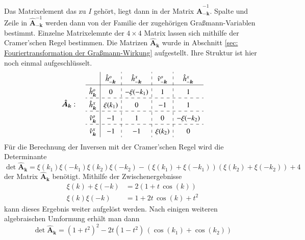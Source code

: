 \noindent Das Matrixelement das zu $I$ gehört, liegt dann in der Matrix $\bm{\hat{A}}_{-\bm{k}}^{-1}$. Spalte und Zeile in  $\bm{\hat{A}}_{-\bm{k}}^{-1}$ werden dann von der Familie der zugehörigen Graßmann-Variablen bestimmt. Einzelne Matrixelemnte der $4\times4$ Matrix lassen sich mithilfe der Cramer'schen Regel bestimmen. Die Matrizen $\bm{\hat{A}_{\bm{k}}}$ wurde in Abschnitt \ref{sec: Fouriertransformation der Graßmann-Wirkung} aufgestellt. Ihre Struktur ist hier noch einmal aufgeschlüsselt.
\begin{equation} \label{eq: struct A_k}
\renewcommand{\arraystretch}{1.5}
    \bm{\hat{A}}_{\bm{k}} : \;\;\;\; \begin{array}{c|c:c:c:c} 
                           & \hat{h}_{-\bm{k}}^o & \hat{h}_{-\bm{k}}^x & \hat{v}_{-\bm{k}}^o & \hat{h}_{-\bm{k}}^x  \\ \hline
        \hat{h}_{\bm{k}}^o & 0                   & -\xi(-k_1)            &  1                  & 1                   \\ \hdashline
        \hat{h}_{\bm{k}}^x & \xi(k_1)          & 0                   &  -1                  &  1                   \\ \hdashline
        \hat{v}_{\bm{k}}^o &-1                   & 1                  &  0                  & -\xi(-k_2)             \\ \hdashline
        \hat{v}_{\bm{k}}^x & -1                   & -1                  &\xi(k_2)           &  0                   \\ 
    \end{array}
\end{equation}
Für die Berechnung der Inversen mit der Cramer'schen Regel wird die Determinante 
\begin{equation} \label{eq: expl det(A_K) xi} 
\det{\bm{\hat{A}}_{\bm{k}}} = \xi(k_1)\xi(-k_1)\xi(k_2)\xi(-k_2) -(\xi(k_1)+\xi(-k_1))(\xi(k_2)+\xi(-k_2)) + 4 
\end{equation}
der Matrix $\bm{\hat{A}}_{\bm{k}}$ benötigt. Mithilfe der Zwischenergebnisse
\begin{align} \nonumber
\xi(k)+\xi(-k) &= 2(1 + t\,\cos(k)) \nonumber \\
\xi(k)\xi(-k) &= 1 + 2t\,\cos(k) + t^2 \nonumber
\end{align} kann dieses Ergebnis weiter aufgelöst werden. Nach einigen weiteren algebraischen Umformung erhält man dann
\begin{equation} \label{eq: expl. det(A_k)}
\det{\bm{\hat{A}}_{\bm{k}}}
    = (1+t^2)^2 - 2t(1-t^2)\,(\cos(k_1) + \cos(k_2))
\end{equation}
